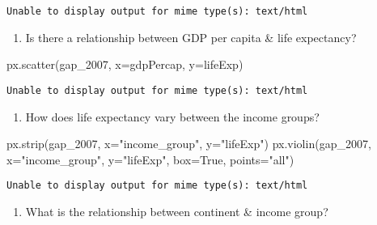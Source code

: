 \documentclass[
  letterpaper,
  DIV=11,
  numbers=noendperiod]{scrreprt}
\newenvironment{Shaded}{\begin{snugshade}}{\end{snugshade}}
\newcommand{\NormalTok}[1]{\textcolor[rgb]{0.00,0.23,0.31}{#1}}
\newcommand{\OperatorTok}[1]{\textcolor[rgb]{0.37,0.37,0.37}{#1}}
\newcommand{\StringTok}[1]{\textcolor[rgb]{0.13,0.47,0.30}{#1}}
\newcommand{\VariableTok}[1]{\textcolor[rgb]{0.07,0.07,0.07}{#1}}
\providecommand{\tightlist}{%
  \setlength{\itemsep}{0pt}\setlength{\parskip}{0pt}}\usepackage{longtable,booktabs,array}
\begin{document}
\begin{verbatim}
Unable to display output for mime type(s): text/html
\end{verbatim}

\begin{enumerate}
\def\labelenumi{\arabic{enumi}.}
\setcounter{enumi}{1}
\tightlist
\item
  Is there a relationship between GDP per capita \& life expectancy?
\end{enumerate}

\begin{Shaded}
\begin{Highlighting}[]
\NormalTok{px.scatter(gap\_2007, x}\OperatorTok{=}\StringTok{\textquotesingle{}gdpPercap\textquotesingle{}}\NormalTok{, y}\OperatorTok{=}\StringTok{\textquotesingle{}lifeExp\textquotesingle{}}\NormalTok{)}
\end{Highlighting}
\end{Shaded}

\begin{verbatim}
Unable to display output for mime type(s): text/html
\end{verbatim}

\begin{enumerate}
\def\labelenumi{\arabic{enumi}.}
\setcounter{enumi}{2}
\tightlist
\item
  How does life expectancy vary between the income groups?
\end{enumerate}

\begin{Shaded}
\begin{Highlighting}[]
\NormalTok{px.strip(gap\_2007, x}\OperatorTok{=}\StringTok{"income\_group"}\NormalTok{, y}\OperatorTok{=}\StringTok{"lifeExp"}\NormalTok{)}
\NormalTok{px.violin(gap\_2007, x}\OperatorTok{=}\StringTok{"income\_group"}\NormalTok{, y}\OperatorTok{=}\StringTok{"lifeExp"}\NormalTok{, box}\OperatorTok{=}\VariableTok{True}\NormalTok{, points}\OperatorTok{=}\StringTok{"all"}\NormalTok{)}
\end{Highlighting}
\end{Shaded}

\begin{verbatim}
Unable to display output for mime type(s): text/html
\end{verbatim}

\begin{enumerate}
\def\labelenumi{\arabic{enumi}.}
\setcounter{enumi}{3}
\tightlist
\item
  What is the relationship between continent \& income group?
\end{enumerate}
\end{document}
